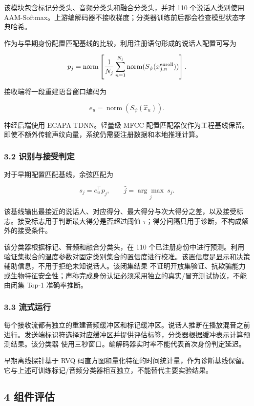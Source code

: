 \documentclass[12pt]{article}
\begin{document}
该模块包含标记分类头、音频分类头和融合分类头，并对 110 个说话人类别使用
AAM-Softmax。上游编解码器不接收梯度；分类器训练前后都会检查模型状态字典哈希。

作为与早期身份配置匹配基线的比较，利用注册语句形成的说话人配置可写为

\[
p_j=\operatorname{norm}\left[
\frac{1}{N_j}\sum_{n=1}^{N_j}
\operatorname{norm}(S_\psi(x^{\rm enroll}_{j,n}))
\right].
\]

接收端将一段重建语音窗口编码为

\[
e_u=\operatorname{norm}(S_\psi(\hat x_u)).
\]

神经后端使用 ECAPA-TDNN。轻量级 MFCC
配置匹配器仅作为工程基线保留。即使不额外传输声纹向量，系统仍需要注册数据和本地推理计算。

\subsubsection{3.2
识别与接受判定}\label{ux8bc6ux522bux4e0eux63a5ux53d7ux5224ux5b9a}

对于早期配置匹配基线，余弦匹配为

\[
s_j=e_u^\top p_j,\qquad
\hat j=\underset{j}{\arg\max}\ s_j.
\]

该基线输出最接近的说话人、对应得分、最大得分与次大得分之差，以及接受标志。接受标志用于判断最大得分是否超过阈值
\(\tau\)；得分间隔只用于诊断，不构成额外的接受条件。

该分类器根据标记、音频和融合分类头，在 110
个已注册身份中进行预测。利用验证集拟合的温度参数对固定类别集合的置信度进行校准。该置信度是显示和决策辅助信息，不用于拒绝未知说话人。该闭集结果
不证明开放集验证、抗欺骗能力或生物特征安全性；声称完成身份认证必须采用独立的真实/冒充测试协议，不能由闭集
Top-1 准确率推断。

\subsubsection{3.3 流式运行}\label{ux6d41ux5f0fux8fd0ux884c}

每个接收流都有独立的重建音频缓冲区和标记缓冲区。说话人推断在播放混音之前进行。发送端标识符选择对应缓冲区并提供评估标签，分类器根据缓冲表示计算预测结果。该分类器
使用三秒窗口。编解码器实时率不能代表首次身份判定延迟。

早期离线探针基于 RVQ
码直方图和量化特征的时间统计量，作为诊断基线保留。它与上述可训练标记/音频分类器相互独立，不能替代主要实验结果。

\subsection{4 组件评估}\label{ux7ec4ux4ef6ux8bc4ux4f30}
\end{document}
